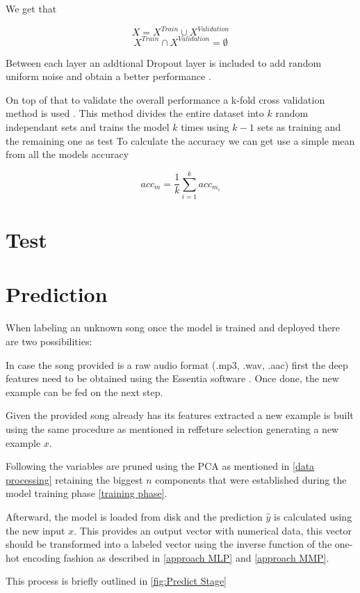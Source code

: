 We get that

$$X = X^{Train} \cup X^{Validation}$$
$$X^{Train} \cap X^{Validation} =  \emptyset $$

Between each layer an addtional Dropout layer is included to add random uniform noise and obtain a better performance \cite{Srivastava2014}.

On top of that to validate the overall performance a k-fold cross validation method is used \cite{Rodriguez2010}.
This method divides the entire dataset into $k$ random independant sets and trains the model $k$ times using $k - 1$ sets as training and the remaining one as test
To calculate the accuracy we can get use a simple mean from all the models accuracy

$$acc_{m} = \frac{1}{k}\sum_{i=1}^{k} acc_{m_{i}}$$



\section{Test}
\label{test stage}
\cite{Flach2015}
\cite{Davis2006}


\section{Prediction}

When labeling an unknown song once the model is trained and deployed there are two possibilities:

In case the song provided is a raw audio format (.mp3, .wav, .aac) first the deep features need to be obtained using the Essentia software \cite{essentia}. Once done, the new example can be fed on the next step.

Given the provided song already has its features extracted a new example is built using the same procedure as mentioned in ref{feture selection} generating a new example $x$.

Following the variables are pruned using the PCA as mentioned in \ref{data processing} retaining the biggest $n$ components that were established during the model training phase \ref{training phase}.

Afterward, the model is loaded from disk and the prediction $\hat{y}$ is calculated using the new input $x$. 
This provides an output vector with numerical data, this vector should be transformed into a labeled vector using the inverse function of the one-hot encoding fashion as described in \ref{approach MLP} and \ref{approach MMP}.

This process is briefly outlined in \ref{fig:Predict Stage}


